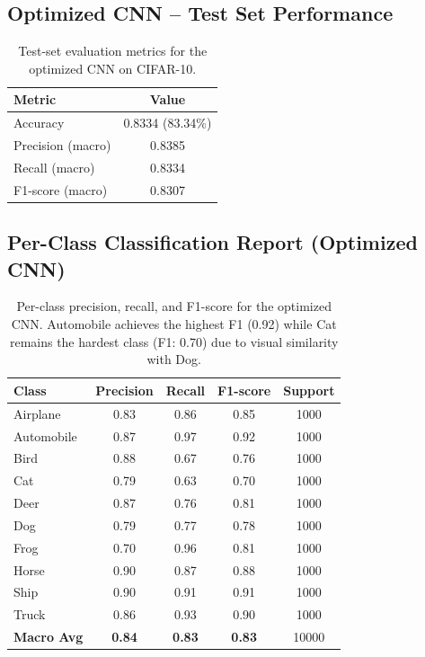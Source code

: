 \documentclass[11pt]{article}
\begin{document}
\subsection{Optimized CNN -- Test Set Performance}
\begin{table}[H]
    \centering
    \begin{tabular}{|l|c|}
        \hline
        \textbf{Metric} & \textbf{Value} \\ \hline
        Accuracy & 0.8334 (83.34\%) \\ \hline
        Precision (macro) & 0.8385 \\ \hline
        Recall (macro) & 0.8334 \\ \hline
        F1-score (macro) & 0.8307 \\ \hline
    \end{tabular}
    \caption{Test-set evaluation metrics for the optimized CNN on CIFAR-10.}
\end{table}

\subsection{Per-Class Classification Report (Optimized CNN)}
\begin{table}[H]
    \centering
    \begin{tabular}{|l|c|c|c|c|}
        \hline
        \textbf{Class} & \textbf{Precision} & \textbf{Recall} & \textbf{F1-score} & \textbf{Support} \\ \hline
        Airplane & 0.83 & 0.86 & 0.85 & 1000 \\ \hline
        Automobile & 0.87 & 0.97 & 0.92 & 1000 \\ \hline
        Bird & 0.88 & 0.67 & 0.76 & 1000 \\ \hline
        Cat & 0.79 & 0.63 & 0.70 & 1000 \\ \hline
        Deer & 0.87 & 0.76 & 0.81 & 1000 \\ \hline
        Dog & 0.79 & 0.77 & 0.78 & 1000 \\ \hline
        Frog & 0.70 & 0.96 & 0.81 & 1000 \\ \hline
        Horse & 0.90 & 0.87 & 0.88 & 1000 \\ \hline
        Ship & 0.90 & 0.91 & 0.91 & 1000 \\ \hline
        Truck & 0.86 & 0.93 & 0.90 & 1000 \\ \hline
        \hline
        \textbf{Macro Avg} & \textbf{0.84} & \textbf{0.83} & \textbf{0.83} & 10000 \\ \hline
    \end{tabular}
    \caption{Per-class precision, recall, and F1-score for the optimized CNN. Automobile achieves the highest F1 (0.92) while Cat remains the hardest class (F1: 0.70) due to visual similarity with Dog.}
\end{table}
\end{document}
